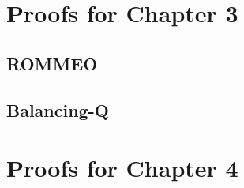 \documentclass{report}
\begin{document}
\chapter{Proofs for Chapter 3}

\section {ROMMEO}


\section {Balancing-Q}


\chapter{Proofs for Chapter 4}




% 
\end{document}
